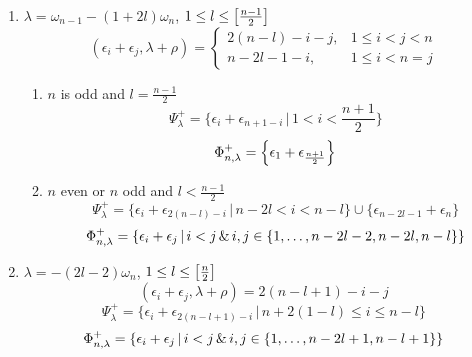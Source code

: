 \begin{enumerate}
  
 \item $\lambda = \omega_{n-1} - (1+2l)\omega_n  $, $  1\leq l \leq \left[ \frac{n-1}{2} \right]$  \\
  \[
   (\epsilon_i + \epsilon_j,\lambda+\rho) = \begin{cases}
                                             2(n-l)-i-j, & 1 \leq i<	j < n \\
                                             n-2l-1-i, & 1 \leq i< n = j
                                            \end{cases}
  \]
  \begin{enumerate}
   \item $n$ is odd and $l=\frac{n-1}{2}$\\
    \[
      \Psi^+_\lambda = \Big\{\epsilon_i + \epsilon_{n+1-i} \,\big|\, 1<i< \frac{n+1}{2} \Big\}
    \]
    \[
      \Phi^+_{n,\lambda} = \left\{ \epsilon_1 + \epsilon_{\frac{n+1}{2}} \right\}
    \]
    
   \item $n$ even or $n$ odd and $l < \frac{n-1}{2}$\\
    \[
      \Psi^+_\lambda = \{\epsilon_i + \epsilon_{2(n-l)-i} \,|\, n-2l<i<n-l \} \cup \{ \epsilon_{n-2l-1} + \epsilon_n \}
    \]
    \[
      \Phi^+_{n,\lambda} = \{ \epsilon_i + \epsilon_j \,|\, i < j \,\&\, i,j\in \{1,\ldots,n-2l-2,n-2l,n-l\} \}
    \]
  \end{enumerate}
  
 \item $\lambda = -(2l-2)\omega_n $, $ 1\leq l \leq \left[ \frac{n}{2} \right] $\\
 \[
  (\epsilon_i + \epsilon_j,\lambda+\rho) = 2(n-l+1)-i-j
 \]
 \[
  \Psi^+_\lambda = \{ \epsilon_i + \epsilon_{2(n-l+1)-i} \,|\, n + 2(1-l) \leq i \leq n-l  \} 
 \]
 \[
  \Phi^+_{n,\lambda} =  \{ \epsilon_i + \epsilon_j \,|\, i < j \,\&\, i,j \in \{ 1,\ldots, n-2l+1,n-l+1 \} \}
 \]


\end{enumerate}
